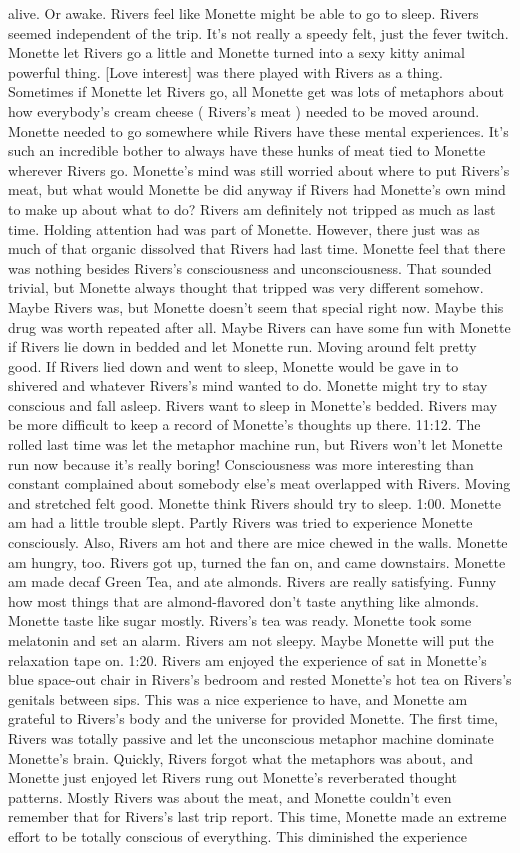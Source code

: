 \documentclass[12pt]{book}
\begin{document}
alive. Or awake. Rivers feel like Monette might be able to go to sleep. Rivers seemed independent of the trip. It's not really a speedy felt, just the fever twitch. Monette let Rivers go a little and Monette turned into a sexy kitty animal powerful thing. [Love interest] was there played with Rivers as a thing. Sometimes if Monette let Rivers go, all Monette get was lots of metaphors about how everybody's cream cheese ( Rivers's meat ) needed to be moved around. Monette needed to go somewhere while Rivers have these mental experiences. It's such an incredible bother to always have these hunks of meat tied to Monette wherever Rivers go. Monette's mind was still worried about where to put Rivers's meat, but what would Monette be did anyway if Rivers had Monette's own mind to make up about what to do? Rivers am definitely not tripped as much as last time. Holding attention had was part of Monette. However, there just was as much of that organic dissolved that Rivers had last time. Monette feel that there was nothing besides Rivers's consciousness and unconsciousness. That sounded trivial, but Monette always thought that tripped was very different somehow. Maybe Rivers was, but Monette doesn't seem that special right now. Maybe this drug was worth repeated after all. Maybe Rivers can have some fun with Monette if Rivers lie down in bedded and let Monette run. Moving around felt pretty good. If Rivers lied down and went to sleep, Monette would be gave in to shivered and whatever Rivers's mind wanted to do. Monette might try to stay conscious and fall asleep. Rivers want to sleep in Monette's bedded. Rivers may be more difficult to keep a record of Monette's thoughts up there. 11:12. The rolled last time was let the metaphor machine run, but Rivers won't let Monette run now because it's really boring! Consciousness was more interesting than constant complained about somebody else's meat overlapped with Rivers. Moving and stretched felt good. Monette think Rivers should try to sleep. 1:00. Monette am had a little trouble slept. Partly Rivers was tried to experience Monette consciously. Also, Rivers am hot and there are mice chewed in the walls. Monette am hungry, too. Rivers got up, turned the fan on, and came downstairs. Monette am made decaf Green Tea, and ate almonds. Rivers are really satisfying. Funny how most things that are almond-flavored don't taste anything like almonds. Monette taste like sugar mostly. Rivers's tea was ready. Monette took some melatonin and set an alarm. Rivers am not sleepy. Maybe Monette will put the relaxation tape on. 1:20. Rivers am enjoyed the experience of sat in Monette's blue space-out chair in Rivers's bedroom and rested Monette's hot tea on Rivers's genitals between sips. This was a nice experience to have, and Monette am grateful to Rivers's body and the universe for provided Monette. The first time, Rivers was totally passive and let the unconscious metaphor machine dominate Monette's brain. Quickly, Rivers forgot what the metaphors was about, and Monette just enjoyed let Rivers rung out Monette's reverberated thought patterns. Mostly Rivers was about the meat, and Monette couldn't even remember that for Rivers's last trip report. This time, Monette made an extreme effort to be totally conscious of everything. This diminished the experience 
\end{document}
